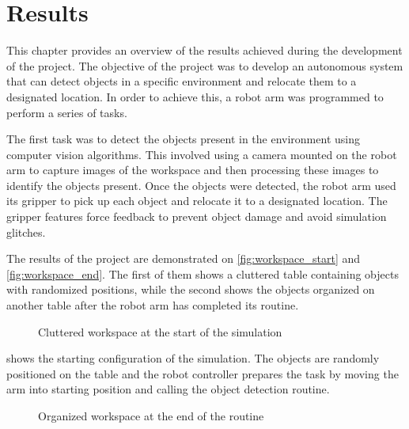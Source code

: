 
\chapter{Results} %
\label{results} %



This chapter provides an overview of the results achieved during the development of the project. The objective of the project was to develop an autonomous system that can detect objects in a specific environment and relocate them to a designated location. In order to achieve this, a robot arm was programmed to perform a series of tasks. 

The first task was to detect the objects present in the environment using computer vision algorithms. This involved using a camera mounted on the robot arm to capture images of the workspace and then processing these images to identify the objects present. Once the objects were detected, the robot arm used its gripper to pick up each object and relocate it to a designated location. The gripper features force feedback to prevent object damage and avoid simulation glitches.

The results of the project are demonstrated on \vref{fig:workspace_start} and \vref{fig:workspace_end}. The first of them shows a cluttered table containing objects with randomized positions, while the second shows the objects organized on another table after the robot arm has completed its routine.

\begin{figure}[!h]
    \centering
    \caption{Cluttered workspace at the start of the simulation }
    \label{fig:workspace_start}
\end{figure}

 shows the starting configuration of the simulation. The objects are randomly positioned on the table and the robot controller prepares the task by moving the arm into starting position and calling the object detection routine.

\begin{figure}[!h]
    \centering
    \caption{Organized workspace at the end of the routine }
    \label{fig:workspace_end}
\end{figure}


